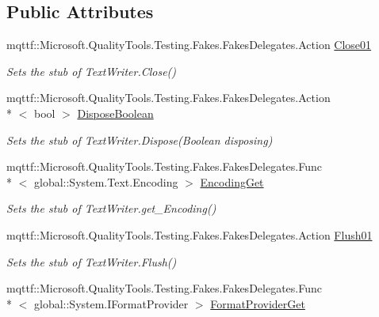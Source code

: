 \subsection*{Public Attributes}
\begin{DoxyCompactItemize}
\item 
mqttf\-::\-Microsoft.\-Quality\-Tools.\-Testing.\-Fakes.\-Fakes\-Delegates.\-Action \hyperlink{class_system_1_1_i_o_1_1_fakes_1_1_stub_text_writer_a37dc561688bfd17ed52315781191a6e4}{Close01}
\begin{DoxyCompactList}\small\item\em Sets the stub of Text\-Writer.\-Close()\end{DoxyCompactList}\item 
mqttf\-::\-Microsoft.\-Quality\-Tools.\-Testing.\-Fakes.\-Fakes\-Delegates.\-Action\\*
$<$ bool $>$ \hyperlink{class_system_1_1_i_o_1_1_fakes_1_1_stub_text_writer_a1ae7ba87739c2d5707ffc5a775fbc5b9}{Dispose\-Boolean}
\begin{DoxyCompactList}\small\item\em Sets the stub of Text\-Writer.\-Dispose(\-Boolean disposing)\end{DoxyCompactList}\item 
mqttf\-::\-Microsoft.\-Quality\-Tools.\-Testing.\-Fakes.\-Fakes\-Delegates.\-Func\\*
$<$ global\-::\-System.\-Text.\-Encoding $>$ \hyperlink{class_system_1_1_i_o_1_1_fakes_1_1_stub_text_writer_a96dcf5702b8f1df1330348e804dc2900}{Encoding\-Get}
\begin{DoxyCompactList}\small\item\em Sets the stub of Text\-Writer.\-get\-\_\-\-Encoding()\end{DoxyCompactList}\item 
mqttf\-::\-Microsoft.\-Quality\-Tools.\-Testing.\-Fakes.\-Fakes\-Delegates.\-Action \hyperlink{class_system_1_1_i_o_1_1_fakes_1_1_stub_text_writer_a88aa3d7d90d6fb2ee6ccd8237cd609e5}{Flush01}
\begin{DoxyCompactList}\small\item\em Sets the stub of Text\-Writer.\-Flush()\end{DoxyCompactList}\item 
mqttf\-::\-Microsoft.\-Quality\-Tools.\-Testing.\-Fakes.\-Fakes\-Delegates.\-Func\\*
$<$ global\-::\-System.\-I\-Format\-Provider $>$ \hyperlink{class_system_1_1_i_o_1_1_fakes_1_1_stub_text_writer_ac9eadc1380c6f3e16abf656e00937f61}{Format\-Provider\-Get}

\end{DoxyCompactItemize}
